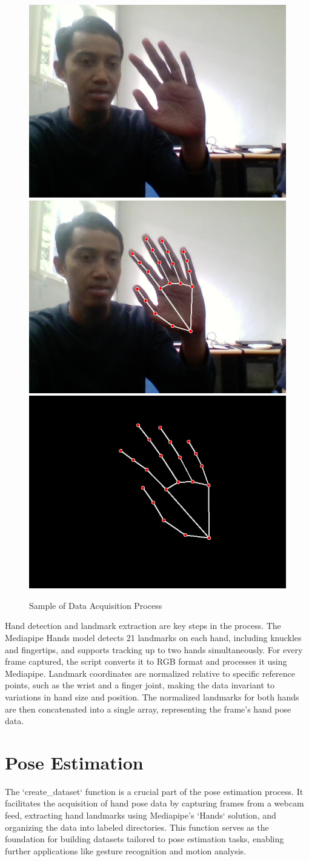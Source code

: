 \begin{figure}[h]
	\centering
	\includegraphics[width=0.3\linewidth]{img/data_cap1} 
	\includegraphics[width=0.3\linewidth]{img/data_cap2}
	\includegraphics[width=0.3\linewidth]{img/data_cap3}
	\caption{Sample of Data Acquisition Process}
	\label{fig:data_acquisition} %
\end{figure}

 Hand detection and landmark extraction are key steps in the process. The Mediapipe Hands model detects 21 landmarks on each hand, including knuckles and fingertips, and supports tracking up to two hands simultaneously. For every frame captured, the script converts it to RGB format and processes it using Mediapipe. Landmark coordinates are normalized relative to specific reference points, such as the wrist and a finger joint, making the data invariant to variations in hand size and position. The normalized landmarks for both hands are then concatenated into a single array, representing the frame’s hand pose data.

\section{Pose Estimation}

The `create\_dataset` function is a crucial part of the pose estimation process. It facilitates the acquisition of hand pose data by capturing frames from a webcam feed, extracting hand landmarks using Mediapipe's `Hands` solution, and organizing the data into labeled directories. This function serves as the foundation for building datasets tailored to pose estimation tasks, enabling further applications like gesture recognition and motion analysis.

